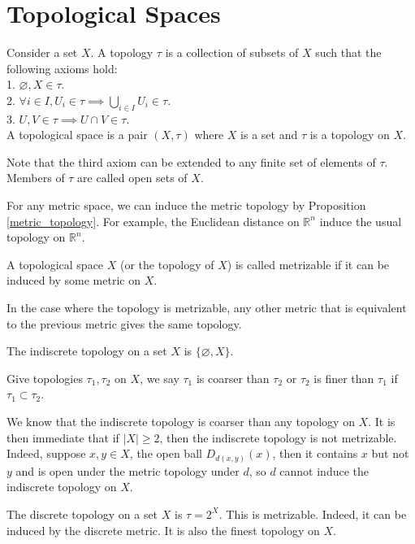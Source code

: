 \section{Topological Spaces}
\begin{definition}
    Consider a set $X$.
    A topology $\tau$ is a collection of subsets of $X$ such that the following axioms hold:\\
    1. $\varnothing, X\in\tau$.\\
    2. $\forall i\in I,U_i\in\tau\implies \bigcup_{i\in I}U_i\in\tau$.\\
    3. $U,V\in\tau\implies U\cap V\in\tau$.\\
    A topological space is a pair $(X,\tau)$ where $X$ is a set and $\tau$ is a topology on $X$.
\end{definition}
Note that the third axiom can be extended to any finite set of elements of $\tau$.\\
Members of $\tau$ are called open sets of $X$.
\begin{example}
    For any metric space, we can induce the metric topology by Proposition \ref{metric_topology}.
    For example, the Euclidean distance on $\mathbb R^n$ induce the usual topology on $\mathbb R^n$.
\end{example}
\begin{definition}
    A topological space $X$ (or the topology of $X$) is called metrizable if it can be induced by some metric on $X$.
\end{definition}
In the case where the topology is metrizable, any other metric that is equivalent to the previous metric gives the same topology.
\begin{example}
    The indiscrete topology on a set $X$ is $\{\varnothing, X\}$.
\end{example}
\begin{definition}
    Give topologies $\tau_1,\tau_2$ on $X$, we say $\tau_1$ is coarser than $\tau_2$ or $\tau_2$ is finer than $\tau_1$ if $\tau_1\subset\tau_2$.
\end{definition}
We know that the indiscrete topology is coarser than any topology on $X$.
It is then immediate that if $|X|\ge 2$, then the indiscrete topology is not metrizable.
Indeed, suppose $x,y\in X$, the open ball $D_{d(x,y)}(x)$, then it contains $x$ but not $y$ and is open under the metric topology under $d$, so $d$ cannot induce the indiscrete topology on $X$.
\begin{example}
    The discrete topology on a set $X$ is $\tau=2^X$.
    This is metrizable.
    Indeed, it can be induced by the discrete metric.
    It is also the finest topology on $X$.
\end{example}
